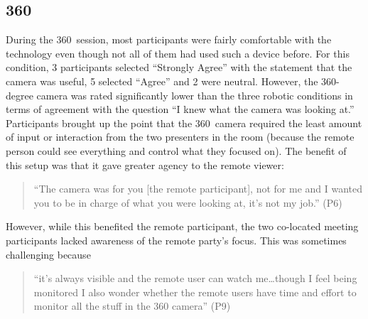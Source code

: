 \documentclass{tufte-handout}
\begin{document}
\subsection{360\textdegree}
During the 360\textdegree\ session, most participants were fairly
comfortable with the technology even though not all of them had used
such a device before.  For this condition, 3 participants selected
``Strongly Agree'' with the statement that the camera was useful, 5
selected ``Agree'' and 2 were neutral. However, the 360-degree camera
was rated significantly lower than the three robotic conditions in
terms of agreement with the question ``I knew what the camera was
looking at.''  Participants brought up the point that the
360\textdegree\ camera required the least amount of input or
interaction from the two presenters in the room (because the remote
person could see everything and control what they focused on). The
benefit of this setup was that it gave greater agency to the remote
viewer:
\begin{quote}
  ``The camera was for you [the remote participant], not for me and I
  wanted you to be in charge of what you were looking at, it's not my
  job.'' (P6)
\end{quote}However, while this benefited the remote participant, the
two co-located meeting participants lacked awareness of the remote
party's focus. This was sometimes challenging because
\begin{quote}
  ``it's always visible and the remote user can watch me\ldots though I
  feel being monitored I also wonder whether the remote users have
  time and effort to monitor all the stuff in the 360 camera'' (P9)
\end{quote}
\end{document}
